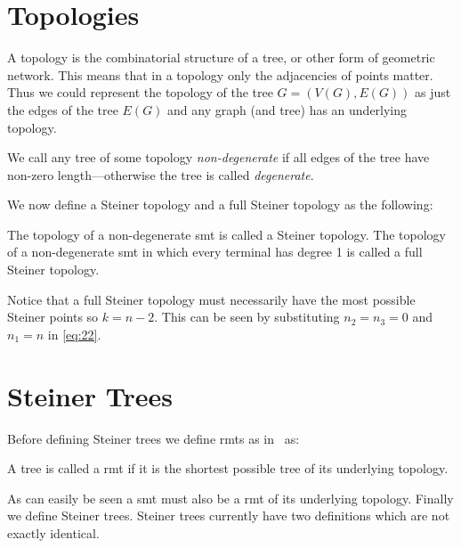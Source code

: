 \section{Topologies}
\label{sec:topologies-1}

A topology is the combinatorial structure of a tree, or other form of geometric
network. This means that in a topology only the adjacencies of points
matter. Thus we could represent the topology of the tree $G = (V(G), E(G))$ as
just the edges of the tree $E(G)$ and any graph (and tree) has an
underlying topology.

We call any tree of some topology \textit{non-degenerate} if all edges of the tree have
non-zero length---otherwise the tree is called \textit{degenerate}.

We now define a Steiner topology and a full Steiner topology as the following:
%
\begin{definition}
  The topology of a non-degenerate \ac{smt} is called a Steiner topology. The
  topology of a non-degenerate \ac{smt} in which every terminal has degree 1 is
  called a full Steiner topology.
\end{definition}
%
Notice that a full Steiner topology must necessarily have the most possible
Steiner points so $ k = n - 2$. This can be seen by substituting $n_2 = n_3 = 0$
and $n_1 = n$ in \cref{eq:22}.

\section{Steiner Trees}
\label{sec:steiner-trees}

Before defining Steiner trees we define \acp{rmt} as in~\cite{gilbert1968}
as:
%
\begin{definition}
  A tree is called a \acl{rmt} if it is the shortest possible tree of its
  underlying topology.
\end{definition}
%
As can easily be seen a \ac{smt} must also be a \ac{rmt} of its underlying
topology. Finally we define Steiner trees. Steiner trees currently have two
definitions which are not exactly identical.

